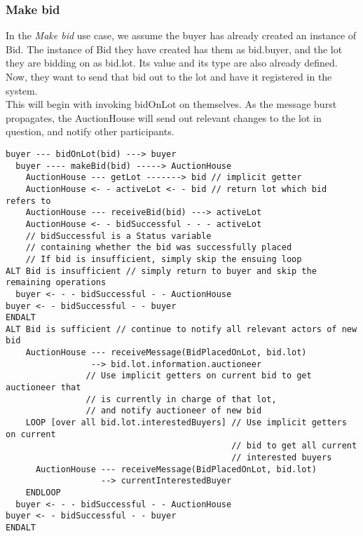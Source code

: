 \documentclass[titlepage, 12pt]{extarticle}
\begin{document}
\subsubsection{Make bid}
In the {\it Make bid} use case, we assume the buyer has already created an instance of Bid. The instance of Bid they have created has them as bid.buyer, and the lot they are bidding on as bid.lot. Its value and its type are also already defined.\\
Now, they want to send that bid out to the lot and have it registered in the system.\\
This will begin with invoking bidOnLot on themselves. As the message burst propagates, the AuctionHouse will send out relevant changes to the lot in question, and notify other participants.
\begin{verbatim}
buyer --- bidOnLot(bid) ---> buyer
  buyer ---- makeBid(bid) -----> AuctionHouse
    AuctionHouse --- getLot -------> bid // implicit getter
    AuctionHouse <- - activeLot <- - bid // return lot which bid refers to
    AuctionHouse --- receiveBid(bid) ---> activeLot
    AuctionHouse <- - bidSuccessful - - - activeLot  
    // bidSuccessful is a Status variable      
    // containing whether the bid was successfully placed
    // If bid is insufficient, simply skip the ensuing loop
ALT Bid is insufficient // simply return to buyer and skip the remaining operations
  buyer <- - - bidSuccessful - - AuctionHouse
buyer <- - bidSuccessful - - buyer
ENDALT
ALT Bid is sufficient // continue to notify all relevant actors of new bid
    AuctionHouse --- receiveMessage(BidPlacedOnLot, bid.lot) 
                 --> bid.lot.information.auctioneer 
                // Use implicit getters on current bid to get auctioneer that
                // is currently in charge of that lot,
                // and notify auctioneer of new bid
    LOOP [over all bid.lot.interestedBuyers] // Use implicit getters on current
                                             // bid to get all current
                                             // interested buyers
      AuctionHouse --- receiveMessage(BidPlacedOnLot, bid.lot) 
                   --> currentInterestedBuyer
    ENDLOOP
  buyer <- - - bidSuccessful - - AuctionHouse
buyer <- - bidSuccessful - - buyer
ENDALT
\end{verbatim}



\end{document}
